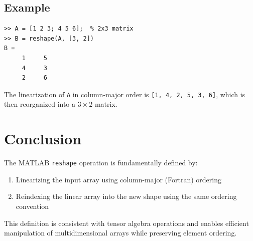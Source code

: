\documentclass[11pt]{article}
\begin{document}
\subsection{Example}

\begin{verbatim}
>> A = [1 2 3; 4 5 6];  % 2x3 matrix
>> B = reshape(A, [3, 2])
B =
     1     5
     4     3
     2     6
\end{verbatim}

The linearization of \texttt{A} in column-major order is \texttt{[1, 4, 2, 5, 3, 6]}, which is then reorganized into a $3 \times 2$ matrix.

\section{Conclusion}

The MATLAB \texttt{reshape} operation is fundamentally defined by:
\begin{enumerate}
    \item Linearizing the input array using column-major (Fortran) ordering
    \item Reindexing the linear array into the new shape using the same ordering convention
\end{enumerate}

This definition is consistent with tensor algebra operations and enables efficient manipulation of multidimensional arrays while preserving element ordering.
\end{document}
